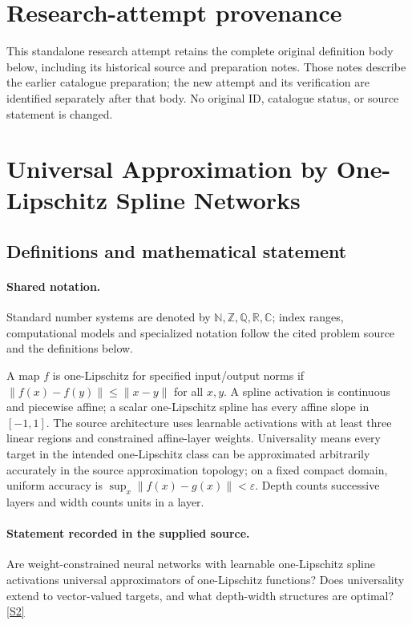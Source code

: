 \documentclass[11pt]{article}
\begin{document}
\section*{Research-attempt provenance}
This standalone research attempt retains the complete original definition body below,
including its historical source and preparation notes. Those notes describe the
earlier catalogue preparation; the new attempt and its verification are identified
separately after that body. No original ID, catalogue status, or source statement is changed.

\section{Universal Approximation by One-Lipschitz Spline Networks}\label{statement}

\subsection{Definitions and mathematical statement}

\paragraph{Shared notation.}Standard number systems are denoted by $\mathbb N,\mathbb Z,\mathbb Q,\mathbb R,\mathbb C$; index ranges, computational models and specialized notation follow the cited problem source and the definitions below.


A map $f$ is one-Lipschitz for specified input/output norms if $\lVert f(x)-f(y)\rVert\leq\lVert x-y\rVert$ for all $x,y$. A spline activation is continuous and piecewise affine; a scalar one-Lipschitz spline has every affine slope in $[-1,1]$. The source architecture uses learnable activations with at least three linear regions and constrained affine-layer weights. Universality means every target in the intended one-Lipschitz class can be approximated arbitrarily accurately in the source approximation topology; on a fixed compact domain, uniform accuracy is $\sup_x\lVert f(x)-g(x)\rVert<\varepsilon$. Depth counts successive layers and width counts units in a layer.
\paragraph{Statement recorded in the supplied source.}
Are weight-constrained neural networks with learnable one-Lipschitz spline activations universal approximators of one-Lipschitz functions? Does universality extend to vector-valued targets, and what depth-width structures are optimal? \href{https://doi.org/10.4171/owr/2022/38}{[S2]}
\end{document}
